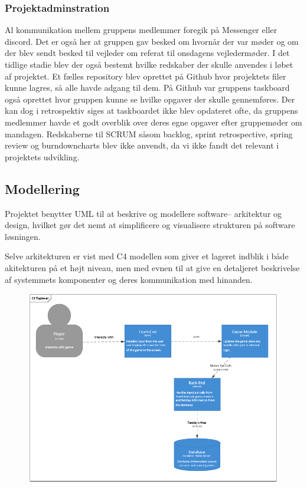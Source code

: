 \subsubsection{Projektadminstration}
Al kommunikation mellem gruppens medlemmer foregik på Messenger eller discord. Det er også her at gruppen gav besked om hvornår der var møder og om der blev sendt besked til vejleder om referat til onsdagens vejledermøder. I det tidlige stadie blev der også bestemt hvilke redskaber der skulle anvendes i løbet af projektet. Et fælles repository blev oprettet på Github hvor projektets filer kunne lagres, så alle havde adgang til dem. På Github var gruppens taskboard også oprettet hvor gruppen kunne se hvilke opgaver der skulle gennemføres. Der kan dog i retrospektiv siges at taskboardet ikke blev opdateret ofte, da gruppens medlemmer havde et godt overblik over deres egne opgaver efter gruppemøder om mandagen. Redskaberne til SCRUM såsom backlog, sprint retrospective, spring review og burndowncharts blev ikke anvendt, da vi ikke fandt det relevant i projektets udvikling.  

\subsection{Modellering}
Projektet benytter UML til at beskrive og modellere software-- arkitektur
og design, hvilket gør det nemt at simplificere og visualisere strukturen på software
løsningen. 

Selve arkitekturen er vist med C4 modellen som giver et lageret indblik i både
akitekturen på et højt niveau, men med evnen til at give en detaljeret beskrivelse
af systemmets komponenter og deres kommunikation med hinanden.

\begin{figure}[H]
  \centering
  \includegraphics[scale=0.8]{02-Body/Images/C4TopLvlDB.PNG}
  \caption{}
  \label{fig:c4}
\end{figure}

